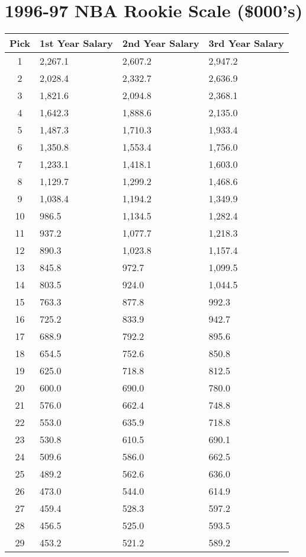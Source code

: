 \documentclass[
]{book}
\begin{document}
\newpage

\hypertarget{nba-rookie-scale-000s-1}{%
\section{1996-97 NBA Rookie Scale (\$000's)}\label{nba-rookie-scale-000s-1}}

\begin{longtable}[]{@{}clll@{}}
\toprule()
Pick & 1st Year Salary & 2nd Year Salary & 3rd Year Salary \\
\midrule()
\endhead
1 & 2,267.1 & 2,607.2 & 2,947.2 \\
2 & 2,028.4 & 2,332.7 & 2,636.9 \\
3 & 1,821.6 & 2,094.8 & 2,368.1 \\
4 & 1,642.3 & 1,888.6 & 2,135.0 \\
5 & 1,487.3 & 1,710.3 & 1,933.4 \\
6 & 1,350.8 & 1,553.4 & 1,756.0 \\
7 & 1,233.1 & 1,418.1 & 1,603.0 \\
8 & 1,129.7 & 1,299.2 & 1,468.6 \\
9 & 1,038.4 & 1,194.2 & 1,349.9 \\
10 & 986.5 & 1,134.5 & 1,282.4 \\
11 & 937.2 & 1,077.7 & 1,218.3 \\
12 & 890.3 & 1,023.8 & 1,157.4 \\
13 & 845.8 & 972.7 & 1,099.5 \\
14 & 803.5 & 924.0 & 1,044.5 \\
15 & 763.3 & 877.8 & 992.3 \\
16 & 725.2 & 833.9 & 942.7 \\
17 & 688.9 & 792.2 & 895.6 \\
18 & 654.5 & 752.6 & 850.8 \\
19 & 625.0 & 718.8 & 812.5 \\
20 & 600.0 & 690.0 & 780.0 \\
21 & 576.0 & 662.4 & 748.8 \\
22 & 553.0 & 635.9 & 718.8 \\
23 & 530.8 & 610.5 & 690.1 \\
24 & 509.6 & 586.0 & 662.5 \\
25 & 489.2 & 562.6 & 636.0 \\
26 & 473.0 & 544.0 & 614.9 \\
27 & 459.4 & 528.3 & 597.2 \\
28 & 456.5 & 525.0 & 593.5 \\
29 & 453.2 & 521.2 & 589.2 \\
\bottomrule()
\end{longtable}
\end{document}

